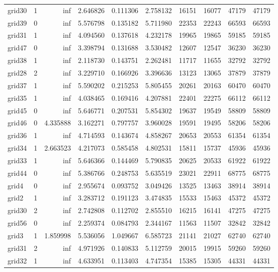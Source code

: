 \begin{longtable}{|l|r|r|r|r|r|r|r|r|r|}
grid30 & 1 & inf & 2.646826 & 0.111306 & 2.758132 & 16151 & 16077 & 47179 & 47179 \\
grid39 & 0 & inf & 5.576798 & 0.135182 & 5.711980 & 22353 & 22243 & 66593 & 66593 \\
grid31 & 1 & inf & 4.094560 & 0.137618 & 4.232178 & 19965 & 19865 & 59185 & 59185 \\
grid47 & 0 & inf & 3.398794 & 0.131688 & 3.530482 & 12607 & 12547 & 36230 & 36230 \\
grid38 & 1 & inf & 2.118730 & 0.143751 & 2.262481 & 11717 & 11655 & 32792 & 32792 \\
grid28 & 2 & inf & 3.229710 & 0.166926 & 3.396636 & 13123 & 13065 & 37879 & 37879 \\
grid37 & 1 & inf & 5.590202 & 0.215253 & 5.805455 & 20261 & 20163 & 60470 & 60470 \\
grid35 & 1 & inf & 4.038465 & 0.169416 & 4.207881 & 22401 & 22275 & 66112 & 66112 \\
grid45 & 0 & inf & 5.646771 & 0.207531 & 5.854302 & 19637 & 19549 & 58809 & 58809 \\
grid46 & 0 & 4.335888 & 3.162271 & 0.797757 & 3.960028 & 19591 & 19495 & 58206 & 58206 \\
grid36 & 1 & inf & 4.714593 & 0.143674 & 4.858267 & 20653 & 20553 & 61354 & 61354 \\
grid34 & 1 & 2.663523 & 4.217073 & 0.585458 & 4.802531 & 15811 & 15737 & 45936 & 45936 \\
grid33 & 1 & inf & 5.646366 & 0.144469 & 5.790835 & 20625 & 20533 & 61922 & 61922 \\
grid44 & 0 & inf & 5.386766 & 0.248753 & 5.635519 & 23021 & 22911 & 68775 & 68775 \\
grid4 & 0 & inf & 2.955674 & 0.093752 & 3.049426 & 13525 & 13463 & 38914 & 38914 \\
grid2 & 1 & inf & 3.283712 & 0.191123 & 3.474835 & 15533 & 15463 & 45372 & 45372 \\
grid30 & 2 & inf & 2.742808 & 0.112702 & 2.855510 & 16215 & 16141 & 47275 & 47275 \\
grid56 & 0 & inf & 2.259374 & 0.084793 & 2.344167 & 11563 & 11507 & 32842 & 32842 \\
grid3 & 1 & 1.859998 & 5.536056 & 1.049667 & 6.585723 & 21141 & 21027 & 62740 & 62740 \\
grid31 & 2 & inf & 4.971926 & 0.140833 & 5.112759 & 20015 & 19915 & 59260 & 59260 \\
grid32 & 1 & inf & 4.633951 & 0.113403 & 4.747354 & 15385 & 15305 & 44331 & 44331 \\

\end{longtable}
